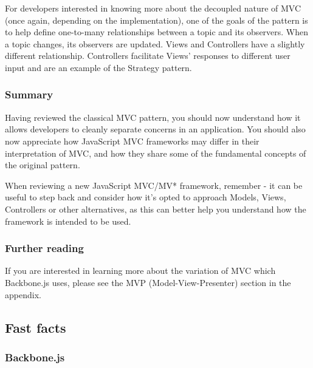 \documentclass[9pt]{book}
\begin{document}
For developers interested in knowing more about the decoupled nature of
MVC (once again, depending on the implementation), one of the goals of
the pattern is to help define one-to-many relationships between a topic
and its observers. When a topic changes, its observers are updated.
Views and Controllers have a slightly different relationship.
Controllers facilitate Views' responses to different user input and are
an example of the Strategy pattern.

\subsubsection{Summary}\label{summary}

Having reviewed the classical MVC pattern, you should now understand how
it allows developers to cleanly separate concerns in an application. You
should also now appreciate how JavaScript MVC frameworks may differ in
their interpretation of MVC, and how they share some of the fundamental
concepts of the original pattern.

When reviewing a new JavaScript MVC/MV* framework, remember - it can be
useful to step back and consider how it's opted to approach Models,
Views, Controllers or other alternatives, as this can better help you
understand how the framework is intended to be used.

\subsubsection{Further reading}\label{further-reading}

If you are interested in learning more about the variation of MVC which
Backbone.js uses, please see the MVP (Model-View-Presenter) section in
the appendix.

\subsection{Fast facts}\label{fast-facts}

\subsubsection{Backbone.js}\label{backbone.js}
\end{document}
